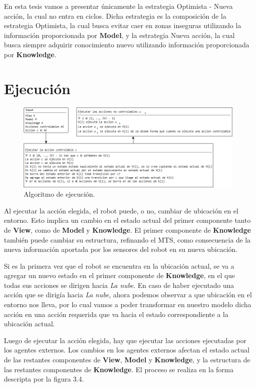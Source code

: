 En esta tesis vamos a presentar únicamente la estrategia Optimista - Nueva acción, la cual no entra en ciclos. Dicha estrategia es la composición de la estrategia 
Optimista, la cual busca evitar caer en zonas inseguras utilizando la información proporcionada por \textbf{Model}, y la estrategia Nueva acción, la cual busca siempre 
adquirir conocimiento nuevo utilizando información proporcionada por \textbf{Knowledge}.

\section{Ejecución}

\begin{figure}[H]
  \centering
    \includegraphics[width=1.0\textwidth]{Imagenes/Algoritmo/Algoritmo_ejecutar.png}
  \caption{Algoritmo de ejecución.}
  \label{fig:Algoritmo_ejecutar}
\end{figure}

Al ejecutar la acción elegida, el robot puede, o no, cambiar de ubicación en el entorno. Esto implica un cambio en el estado actual del primer componente tanto 
de \textbf{View}, como de \textbf{Model} y \textbf{Knowledge}. El primer componente de \textbf{Knowledge} también puede cambiar su estructura, refinando el MTS, 
como consecuencia de la nueva información aportada por los sensores del robot en su nueva ubicación.


Si es la primera vez que el robot se encuentra en la ubicación actual, se va a agregar un nuevo estado en el primer componente de \textbf{Knowledge}, en el que todas 
sus acciones se dirigen hacia \textit{La nube}. En caso de haber ejecutado una acción que se dirigía hacia \textit{La nube}, ahora podemos observar a que ubicación 
en el entorno nos lleva, por lo cual vamos a poder transformar en nuestro modelo dicha acción en una acción requerida que va hacia el estado correspondiente 
a la ubicación actual.


Luego de ejecutar la acción elegida, hay que ejecutar las acciones ejecutadas por los agentes externos. Los cambios en los agentes externos afectan el estado actual 
de las restantes componentes de \textbf{View}, \textbf{Model} y \textbf{Knowledge}, y la estructura de las restantes componentes de \textbf{Knowledge}. El proceso se 
realiza en la forma descripta por la figura 3.4.

